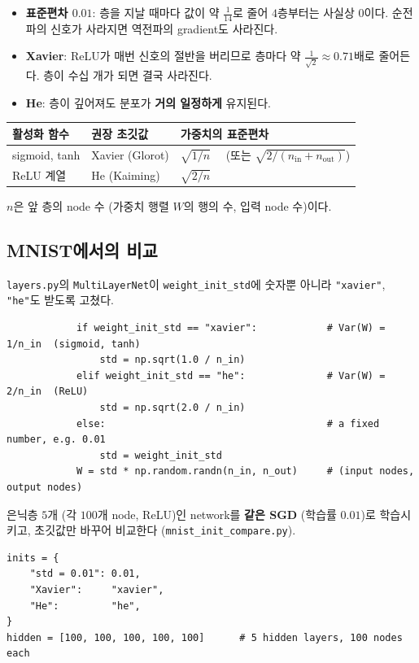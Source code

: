 \documentclass[11pt,a4paper]{article}
\begin{document}
\begin{itemize}[leftmargin=1.8em]
\item \textbf{표준편차 $0.01$}: 층을 지날 때마다 값이 약 $\frac{1}{14}$로 줄어 $4$층부터는 사실상 $0$이다.
순전파의 신호가 사라지면 역전파의 gradient도 사라진다.
\item \textbf{Xavier}: ReLU가 매번 신호의 절반을 버리므로 층마다 약 $\frac{1}{\sqrt2}\approx0.71$배로 줄어든다.
층이 수십 개가 되면 결국 사라진다.
\item \textbf{He}: 층이 깊어져도 분포가 \textbf{거의 일정하게} 유지된다.
\end{itemize}

\begin{keybox}[초깃값 정리]
\begin{center}
\begin{tabular}{@{}lll@{}}
\toprule
활성화 함수 & 권장 초깃값 & 가중치의 표준편차 \\
\midrule
sigmoid, tanh & Xavier (Glorot) & $\sqrt{1/n}$ \ \ (또는 $\sqrt{2/(n_{\mathrm{in}}+n_{\mathrm{out}})}$) \\
ReLU 계열 & He (Kaiming) & $\sqrt{2/n}$ \\
\bottomrule
\end{tabular}
\end{center}
$n$은 앞 층의 node 수 (가중치 행렬 $W$의 행의 수, 입력 node 수)이다.
\end{keybox}

\subsection{MNIST에서의 비교}\label{sec:mnistinit}

\texttt{layers.py}의 \texttt{MultiLayerNet}이 \texttt{weight\_init\_std}에 숫자뿐 아니라
\texttt{"xavier"}, \texttt{"he"}도 받도록 고쳤다.
\begin{lstlisting}
            if weight_init_std == "xavier":            # Var(W) = 1/n_in  (sigmoid, tanh)
                std = np.sqrt(1.0 / n_in)
            elif weight_init_std == "he":              # Var(W) = 2/n_in  (ReLU)
                std = np.sqrt(2.0 / n_in)
            else:                                      # a fixed number, e.g. 0.01
                std = weight_init_std
            W = std * np.random.randn(n_in, n_out)     # (input nodes, output nodes)
\end{lstlisting}

은닉층 $5$개 (각 $100$개 node, ReLU)인 network를 \textbf{같은 SGD} (학습률 $0.01$)로 학습시키고,
초깃값만 바꾸어 비교한다 (\texttt{mnist\_init\_compare.py}).
\begin{lstlisting}
inits = {
    "std = 0.01": 0.01,
    "Xavier":     "xavier",
    "He":         "he",
}
hidden = [100, 100, 100, 100, 100]      # 5 hidden layers, 100 nodes each
\end{lstlisting}
\end{document}
